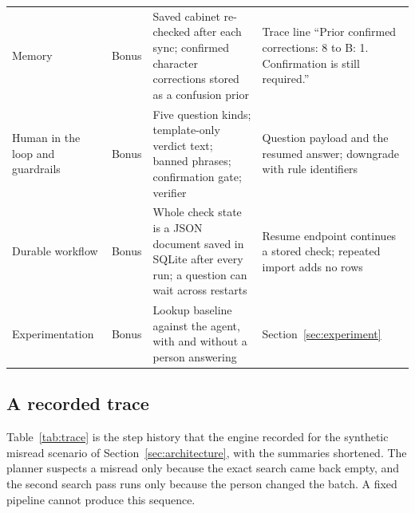 \begin{table}[t]
\begin{tabularx}{\textwidth}{@{}>{\raggedright\arraybackslash}p{24mm} >{\raggedright\arraybackslash}p{9mm} X X@{}}
Memory & Bonus & Saved cabinet re-checked after each sync; confirmed character corrections stored as a confusion prior & Trace line ``Prior confirmed corrections: 8 to B: 1. Confirmation is still required.'' \\
Human in the loop and guardrails & Bonus & Five question kinds; template-only verdict text; banned phrases; confirmation gate; verifier & Question payload and the resumed answer; downgrade with rule identifiers \\
Durable workflow & Bonus & Whole check state is a JSON document saved in SQLite after every run; a question can wait across restarts & Resume endpoint continues a stored check; repeated import adds no rows \\
Experimentation & Bonus & Lookup baseline against the agent, with and without a person answering & Section~\ref{sec:experiment} \\
\bottomrule
\end{tabularx}
\end{table}

\subsection{A recorded trace}
Table~\ref{tab:trace} is the step history that the engine recorded for the synthetic misread scenario of Section~\ref{sec:architecture}, with the summaries shortened. The planner suspects a misread only because the exact search came back empty, and the second search pass runs only because the person changed the batch. A fixed pipeline cannot produce this sequence.

